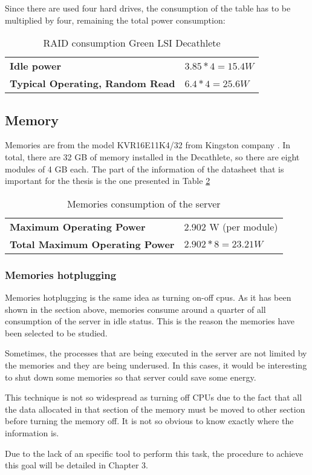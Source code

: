 Since there are used four hard drives, the consumption of the table has to be multiplied by four, remaining the total power consumption:
\begin{table}[H]
\begin{center}
\begin{tabular}{p{8cm} p{3cm}}
  \hline
  \bf Idle power & $3.85 * 4 = 15.4 W$ \\
  \bf Typical Operating, Random Read & $6.4 * 4 = 25.6 W$ \\
  \hline
\end{tabular}
\end{center}
\caption{RAID consumption Green LSI Decathlete}
\label{tab:disk_spec2}
\end{table}
    
    \subsection{Memory}
    

Memories are from the model KVR16E11K4/32 from Kingston company \cite{memoryDatasheet}. In total, there are 32 GB of memory installed in the Decathlete, so there are eight modules of 4 GB each. The part of the information of the datasheet that is important for the thesis is the one presented in Table \ref{tab:mem_spec}

\begin{table}[H]
\begin{center}
\begin{tabular}{p{8cm} p{5cm}}
  \hline
  \bf Maximum Operating Power &  2.902 W (per module) \\
  \bf Total Maximum Operating Power & $2.902 * 8 = 23.21 W$ \\
  \hline
\end{tabular}
\end{center}
\caption{Memories consumption of the server}
\label{tab:mem_spec}
\end{table}

\subsubsection{Memories hotplugging}

Memories hotplugging is the same idea as turning on-off cpus. As it has been shown in the section above, memories consume around a quarter of all consumption of the server in idle status. This is the reason the memories have been selected to be studied.

Sometimes, the processes that are being executed in the server are not limited by the memories and they are being underused. In this cases, it would be interesting to shut down some memories so that server could save some energy.

This technique is not so widespread as turning off CPUs due to the fact that all the data allocated in that section of the memory must be moved to other section before turning the memory off. It is not so obvious to know exactly where the information is.

Due to the lack of an specific tool to perform this task, the procedure to achieve this goal will be detailed in Chapter 3.